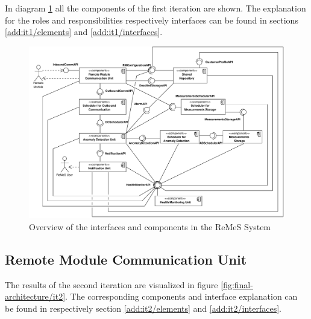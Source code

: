 \npar In diagram \ref{fig:final-architecture/it1} all the components of the
first iteration are shown. The explanation for the roles and responsibilities
respectively interfaces can be found in sections \ref{add:it1/elements} and
\ref{add:it1/interfaces}.

\begin{figure}[H]
	\begin{centering}
		\includegraphics[width=1.4\textwidth,angle=90]{figs/add-it1-interfaces.pdf}
		\caption{Overview of the interfaces and components in the ReMeS
		System}
		\label{fig:final-architecture/it1}
	\end{centering}
\end{figure}

\subsection{Remote Module Communication Unit}

\npar The results of the second iteration are visualized in figure
\ref{fig:final-architecture/it2}. The corresponding components and interface
explanation can be found in respectively section \ref{add:it2/elements} and
\ref{add:it2/interfaces}.

